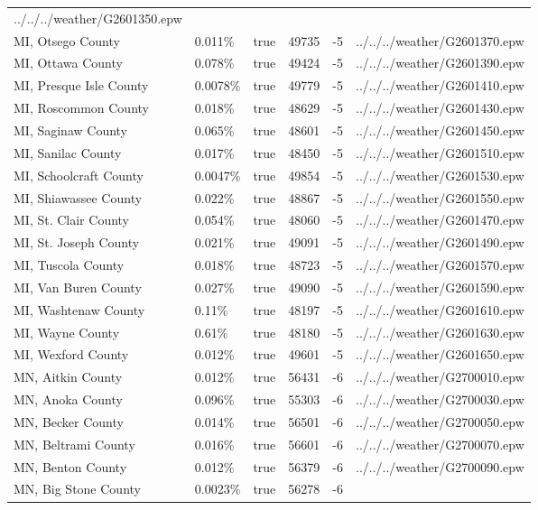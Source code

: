 \begin{longtable}[]{@{}llllll@{}}
../../../weather/G2601350.epw \\
MI, Otsego County & 0.011\% & true & 49735 & -5 &
../../../weather/G2601370.epw \\
MI, Ottawa County & 0.078\% & true & 49424 & -5 &
../../../weather/G2601390.epw \\
MI, Presque Isle County & 0.0078\% & true & 49779 & -5 &
../../../weather/G2601410.epw \\
MI, Roscommon County & 0.018\% & true & 48629 & -5 &
../../../weather/G2601430.epw \\
MI, Saginaw County & 0.065\% & true & 48601 & -5 &
../../../weather/G2601450.epw \\
MI, Sanilac County & 0.017\% & true & 48450 & -5 &
../../../weather/G2601510.epw \\
MI, Schoolcraft County & 0.0047\% & true & 49854 & -5 &
../../../weather/G2601530.epw \\
MI, Shiawassee County & 0.022\% & true & 48867 & -5 &
../../../weather/G2601550.epw \\
MI, St. Clair County & 0.054\% & true & 48060 & -5 &
../../../weather/G2601470.epw \\
MI, St. Joseph County & 0.021\% & true & 49091 & -5 &
../../../weather/G2601490.epw \\
MI, Tuscola County & 0.018\% & true & 48723 & -5 &
../../../weather/G2601570.epw \\
MI, Van Buren County & 0.027\% & true & 49090 & -5 &
../../../weather/G2601590.epw \\
MI, Washtenaw County & 0.11\% & true & 48197 & -5 &
../../../weather/G2601610.epw \\
MI, Wayne County & 0.61\% & true & 48180 & -5 &
../../../weather/G2601630.epw \\
MI, Wexford County & 0.012\% & true & 49601 & -5 &
../../../weather/G2601650.epw \\
MN, Aitkin County & 0.012\% & true & 56431 & -6 &
../../../weather/G2700010.epw \\
MN, Anoka County & 0.096\% & true & 55303 & -6 &
../../../weather/G2700030.epw \\
MN, Becker County & 0.014\% & true & 56501 & -6 &
../../../weather/G2700050.epw \\
MN, Beltrami County & 0.016\% & true & 56601 & -6 &
../../../weather/G2700070.epw \\
MN, Benton County & 0.012\% & true & 56379 & -6 &
../../../weather/G2700090.epw \\
MN, Big Stone County & 0.0023\% & true & 56278 & -6 &

\end{longtable}
